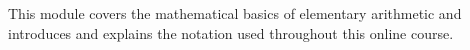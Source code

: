 







\begin{MSectionStart}
This module covers the mathematical basics of elementary arithmetic and introduces and explains the 
notation used throughout this online course. 



\MModstartBox
\end{MSectionStart}


